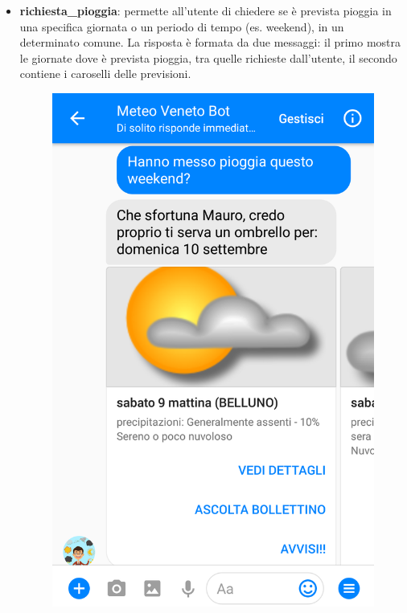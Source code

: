 \begin{itemize}
	\item \textbf{richiesta\_pioggia}: permette all'utente di chiedere se è prevista pioggia in una specifica giornata o un periodo di tempo (es. weekend), in un determinato comune. La risposta è formata da due messaggi: il primo mostra le giornate dove è prevista pioggia, tra quelle richieste dall'utente, il secondo contiene i caroselli delle previsioni.
	\begin{figure}[!h]
		\centering
		\includegraphics[scale=0.15]{../Immagini/richiesta_pioggia.png}%
		\qquad\qquad

\end{figure}
\end{itemize}
